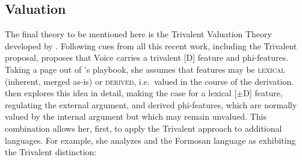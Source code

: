 \begin{exe}
\begin{xlist}
\begin{xlist}
\begin{xlist}
\begin{xlist}
\begin{xlist}
\begin{xlist}
\begin{exe}
\begin{xlist}
\begin{exe}
\begin{exe}
\begin{xlist}
\begin{exe}
\begin{exe}
\begin{xlist}
\begin{exe}
\begin{xlist}
\begin{exe}
\begin{xlist}
\begin{exe}
\begin{xlist}
\begin{exe}
\begin{xlist}
\begin{exe}
\begin{xlist}
\begin{exe}
\begin{xlist}
\begin{exe}
\begin{xlist}
	\subsection{Valuation} \label{i:agree:nie}
The final theory to be mentioned here is the Trivalent Valuation Theory developed by \cite{nie17}. Following cues from all this recent work, including the Trivalent proposal, \citeauthor{nie17} proposes that Voice carries a trivalent [D] feature and phi-features. Taking a page out of \citeauthor{wurmbrandshimamura17}'s playbook, she assumes that features may be \textsc{lexical} (inherent, merged as-is) or \textsc{derived}, i.e.~valued in the course of the derivation. \citeauthor{nie17} then explores this idea in detail, making the case for a lexical [$\pm$D] feature, regulating the external argument, and derived phi-features, which are normally valued by the internal argument but which may remain unvalued. This combination allows her, first, to apply the Trivalent approach to additional languages. For example, she analyzes  and the Formosan language  as exhibiting the Trivalent distinction:
 \begin{exe}
 \ex \label{ex:puyuma} 
 \begin{xlist} 
	
	
 \z
\z 


\end{xlist}
\end{exe}
\end{xlist}
\end{exe}
\end{xlist}
\end{exe}
\end{xlist}
\end{exe}
\end{xlist}
\end{exe}
\end{xlist}
\end{exe}
\end{xlist}
\end{exe}
\end{xlist}
\end{exe}
\end{xlist}
\end{exe}
\end{exe}
\end{xlist}
\end{exe}
\end{exe}
\end{xlist}
\end{exe}
\end{xlist}
\end{xlist}
\end{xlist}
\end{xlist}
\end{xlist}
\end{xlist}
\end{exe}
